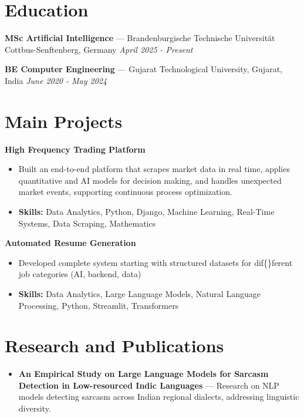 \documentclass[a4paper,10pt]{article}
\begin{document}
\section*{Education}
\textbf{MSc Artificial Intelligence} — Brandenburgische Technische Universität Cottbus-Senftenberg, Germany \hfill \textit{April 2025 - Present}\par
\vspace{1.5pt}
\textbf{BE Computer Engineering} — Gujarat Technological University, Gujarat, India \hfill \textit{June 2020 - May 2024}\par

\section*{Main Projects}
\textbf{High Frequency Trading Platform}\par
\vspace{1pt}
\begin{itemize}
  \item Built an end-to-end platform that scrapes market data in real time, applies quantitative and AI models for decision making, and handles unexpected market events, supporting continuous process optimization.
  \item \textbf{Skills:} Data Analytics, Python, Django, Machine Learning, Real-Time Systems, Data Scraping, Mathematics
\end{itemize}
\vspace{3pt}
\textbf{Automated Resume Generation}\par
\vspace{1pt}
\begin{itemize}
  \item Developed complete system starting with structured datasets for dif\{\}ferent job categories (AI, backend, data)
  \item \textbf{Skills:} Data Analytics, Large Language Models, Natural Language Processing, Python, Streamlit, Transformers
\end{itemize}

\section*{Research and Publications}
\begin{itemize}
\item \textbf{An Empirical Study on Large Language Models for Sarcasm Detection in Low-resourced Indic Languages} — Research on NLP models detecting sarcasm across Indian regional dialects, addressing linguistic diversity.
\end{itemize}
\end{document}
